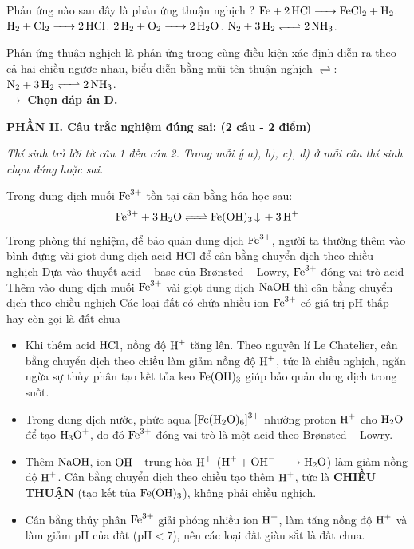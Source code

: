 \documentclass[11pt,a4paper]{article}
\begin{document}
\begin{ex}%
Phản ứng nào sau đây là phản ứng thuận nghịch ?
\choice
{$\ce{Fe + 2HCl -> FeCl2 + H2}$.}
{$\ce{H2 + Cl2 -> 2HCl}$.}
{$\ce{2H2 + O2 -> 2H2O}$.}
{\True $\ce{N2 + 3H2 <=> 2NH3}$.}
\begin{loigiai}
Phản ứng thuận nghịch là phản ứng trong cùng điều kiện xác định diễn ra theo cả hai chiều ngược nhau, biểu diễn bằng mũi tên thuận nghịch $\rightleftharpoons$:\\
$\ce{N2 + 3H2 <=> 2NH3}$.\\
$\rightarrow$ \textbf{Chọn đáp án D.}
\end{loigiai}
\end{ex}

\vspace{6pt}
\noindent
\textbf{\large\color{mainGreen}PHẦN II. Câu trắc nghiệm đúng sai: (2 câu - 2 điểm)}

\textit{Thí sinh trả lời từ câu 1 đến câu 2. Trong mỗi ý a), b), c), d) ở mỗi câu thí sinh chọn đúng hoặc sai.}
\vspace{4pt}

\begin{ex}%
Trong dung dịch muối $\ce{Fe^{3+}}$ tồn tại cân bằng hóa học sau:
$$\ce{Fe^{3+} + 3H2O <=> Fe(OH)3 v + 3H+}$$
\choiceTF
{\True Trong phòng thí nghiệm, để bảo quản dung dịch $\ce{Fe^{3+}}$, người ta thường thêm vào bình đựng vài giọt dung dịch acid $\ce{HCl}$ để cân bằng chuyển dịch theo chiều nghịch}
{\True Dựa vào thuyết acid – base của Brønsted – Lowry, $\ce{Fe^{3+}}$ đóng vai trò acid}
{Thêm vào dung dịch muối $\ce{Fe^{3+}}$ vài giọt dung dịch $\ce{NaOH}$ thì cân bằng chuyển dịch theo chiều nghịch}
{\True Các loại đất có chứa nhiều ion $\ce{Fe^{3+}}$ có giá trị pH thấp hay còn gọi là đất chua}
\begin{loigiai}
\begin{itemize}[leftmargin=1.5cm]
\item[\textbf{a) ĐÚNG:}] Khi thêm acid $\ce{HCl}$, nồng độ $\ce{H+}$ tăng lên. Theo nguyên lí Le Chatelier, cân bằng chuyển dịch theo chiều làm giảm nồng độ $\ce{H+}$, tức là chiều nghịch, ngăn ngừa sự thủy phân tạo kết tủa keo $\ce{Fe(OH)3}$ giúp bảo quản dung dịch trong suốt.
\item[\textbf{b) ĐÚNG:}] Trong dung dịch nước, phức aqua $\ce{[Fe(H2O)6]^{3+}}$ nhường proton $\ce{H+}$ cho $\ce{H2O}$ để tạo $\ce{H3O+}$, do đó $\ce{Fe^{3+}}$ đóng vai trò là một acid theo Brønsted -- Lowry.
\item[\textbf{c) SAI:}] Thêm $\ce{NaOH}$, ion $\ce{OH-}$ trung hòa $\ce{H+}$ ($\ce{H+ + OH- -> H2O}$) làm giảm nồng độ $\ce{H+}$. Cân bằng chuyển dịch theo chiều tạo thêm $\ce{H+}$, tức là \textbf{CHIỀU THUẬN} (tạo kết tủa $\ce{Fe(OH)3}$), không phải chiều nghịch.
\item[\textbf{d) ĐÚNG:}] Cân bằng thủy phân $\ce{Fe^{3+}}$ giải phóng nhiều ion $\ce{H+}$, làm tăng nồng độ $\ce{H+}$ và làm giảm $\text{pH}$ của đất ($\text{pH} < 7$), nên các loại đất giàu sắt là đất chua.
\end{itemize}
\end{loigiai}
\end{ex}
\end{document}
